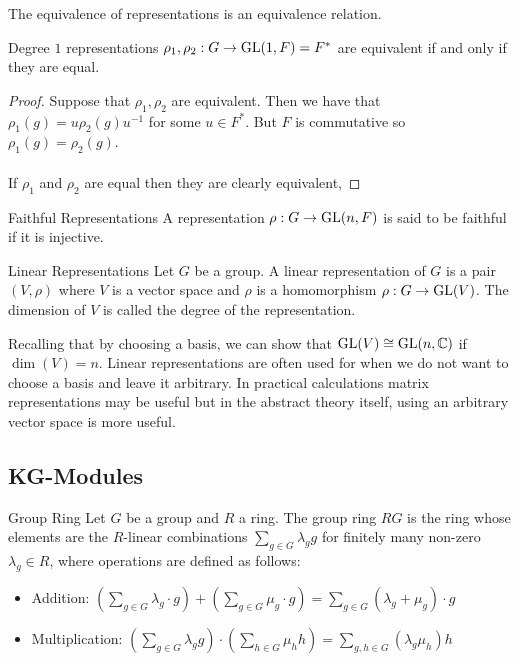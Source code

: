 \documentclass[a4paper]{article}
\begin{document}
\begin{lmm}{}{} The equivalence of representations is an equivalence relation. 
\end{lmm}

\begin{lmm}{}{} Degree $1$ representations $\rho_1,\rho_2:G\to\operatorname{GL}(1,F)=F^\ast$ are equivalent if and only if they are equal. \tcbline
\begin{proof}
Suppose that $\rho_1,\rho_2$ are equivalent. Then we have that $\rho_1(g)=u\rho_2(g)u^{-1}$ for some $u\in F^\ast$. But $F$ is commutative so $\rho_1(g)=\rho_2(g)$. \\~\\
If $\rho_1$ and $\rho_2$ are equal then they are clearly equivalent, 
\end{proof}
\end{lmm}

\begin{defn}{Faithful Representations}{} A representation $\rho:G\to\operatorname{GL}(n,F)$ is said to be faithful if it is injective. 
\end{defn}

\begin{defn}{Linear Representations}{} Let $G$ be a group. A linear representation of $G$ is a pair $(V,\rho)$ where $V$ is a vector space and $\rho$ is a homomorphism $\rho:G\to\operatorname{GL}(V)$. The dimension of $V$ is called the degree of the representation. 
\end{defn}

Recalling that by choosing a basis, we can show that $\operatorname{GL}(V)\cong\operatorname{GL}(n,\mathbb{C})$ if $\dim(V)=n$. Linear representations are often used for when we do not want to choose a basis and leave it arbitrary. In practical calculations matrix representations may be useful but in the abstract theory itself, using an arbitrary vector space is more useful. 

\subsection{KG-Modules}
\begin{defn}{Group Ring}{} Let $G$ be a group and $R$ a ring. The group ring $RG$ is the ring whose elements are the $R$-linear combinations $\sum_{g\in G}\lambda_gg$ for finitely many non-zero $\lambda_g\in R$, where operations are defined as follows: 
\begin{itemize}
\item Addition: $\left(\sum_{g\in G}\lambda_g\cdot g\right)+\left(\sum_{g\in G}\mu_g\cdot g\right)=\sum_{g\in G}(\lambda_g+\mu_g)\cdot g$
\item Multiplication: $\left(\sum_{g\in G}\lambda_gg\right)\cdot\left(\sum_{h\in G}\mu_h h\right)=\sum_{g,h\in G}(\lambda_g\mu_h)h$
\end{itemize}
\end{defn}
\end{document}
